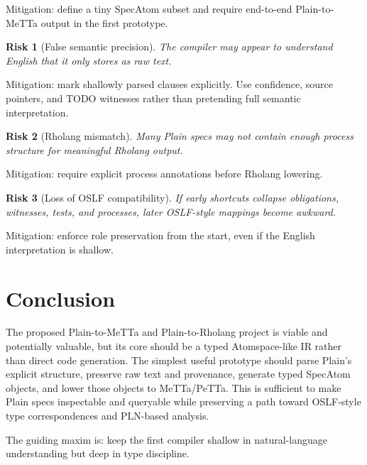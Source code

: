 \documentclass[11pt]{article}
\newtheorem{risk}{Risk}
\begin{document}
\noindent Mitigation: define a tiny SpecAtom subset and require end-to-end
Plain-to-MeTTa output in the first prototype.

\begin{risk}[False semantic precision]
The compiler may appear to understand English that it only stores as raw text.
\end{risk}

\noindent Mitigation: mark shallowly parsed clauses explicitly. Use confidence,
source pointers, and TODO witnesses rather than pretending full semantic
interpretation.

\begin{risk}[Rholang mismatch]
Many Plain specs may not contain enough process structure for meaningful
Rholang output.
\end{risk}

\noindent Mitigation: require explicit process annotations before Rholang
lowering.

\begin{risk}[Loss of OSLF compatibility]
If early shortcuts collapse obligations, witnesses, tests, and processes, later
OSLF-style mappings become awkward.
\end{risk}

\noindent Mitigation: enforce role preservation from the start, even if the
English interpretation is shallow.

\section{Conclusion}

The proposed Plain-to-MeTTa and Plain-to-Rholang project is viable and
potentially valuable, but its core should be a typed Atomspace-like IR rather
than direct code generation. The simplest useful prototype should parse Plain's
explicit structure, preserve raw text and provenance, generate typed SpecAtom
objects, and lower those objects to MeTTa/PeTTa. This is sufficient to make Plain
specs inspectable and queryable while preserving a path toward OSLF-style type
correspondences and PLN-based analysis.

The guiding maxim is: keep the first compiler shallow in natural-language
understanding but deep in type discipline.
\end{document}
